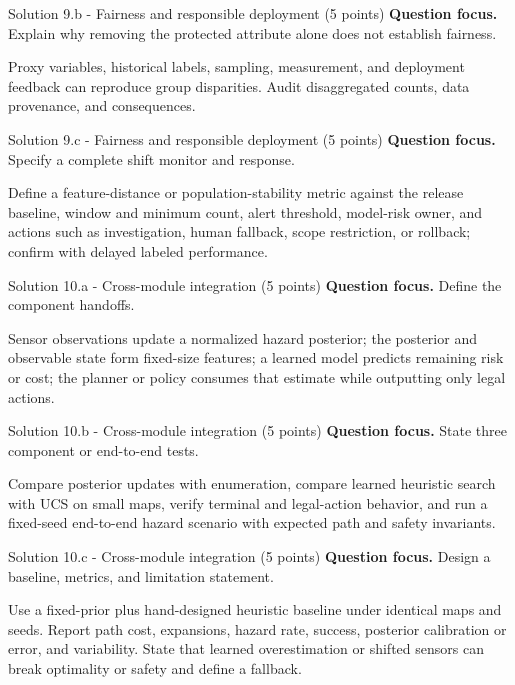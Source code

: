 \documentclass[aspectratio=169,11pt]{beamer}
\begin{document}
\begin{frame}{Solution 9.b - Fairness and responsible deployment (5 points)}
\small
\textbf{Question focus.} Explain why removing the protected attribute alone does not establish fairness.

\vspace{0.25cm}
\answerlabel Proxy variables, historical labels, sampling, measurement, and deployment feedback can reproduce group disparities. Audit disaggregated counts, data provenance, and consequences.
\end{frame}

\begin{frame}{Solution 9.c - Fairness and responsible deployment (5 points)}
\small
\textbf{Question focus.} Specify a complete shift monitor and response.

\vspace{0.25cm}
\answerlabel Define a feature-distance or population-stability metric against the release baseline, window and minimum count, alert threshold, model-risk owner, and actions such as investigation, human fallback, scope restriction, or rollback; confirm with delayed labeled performance.
\end{frame}

\begin{frame}{Solution 10.a - Cross-module integration (5 points)}
\small
\textbf{Question focus.} Define the component handoffs.

\vspace{0.25cm}
\answerlabel Sensor observations update a normalized hazard posterior; the posterior and observable state form fixed-size features; a learned model predicts remaining risk or cost; the planner or policy consumes that estimate while outputting only legal actions.
\end{frame}

\begin{frame}{Solution 10.b - Cross-module integration (5 points)}
\small
\textbf{Question focus.} State three component or end-to-end tests.

\vspace{0.25cm}
\answerlabel Compare posterior updates with enumeration, compare learned heuristic search with UCS on small maps, verify terminal and legal-action behavior, and run a fixed-seed end-to-end hazard scenario with expected path and safety invariants.
\end{frame}

\begin{frame}{Solution 10.c - Cross-module integration (5 points)}
\small
\textbf{Question focus.} Design a baseline, metrics, and limitation statement.

\vspace{0.25cm}
\answerlabel Use a fixed-prior plus hand-designed heuristic baseline under identical maps and seeds. Report path cost, expansions, hazard rate, success, posterior calibration or error, and variability. State that learned overestimation or shifted sensors can break optimality or safety and define a fallback.
\end{frame}
\end{document}
